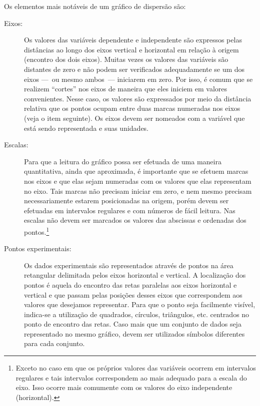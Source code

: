 Os elementos mais notáveis de um gráfico de dispersão são:
\begin{description}
	\item[Eixos:] Os valores das variáveis dependente e independente  são expressos pelas distâncias ao longo dos eixos vertical e horizontal em relação à origem (encontro dos dois eixos). Muitas vezes os valores das variáveis são distantes de zero e não podem ser verificados adequadamente se um dos eixos ---~ou mesmo ambos~--- iniciarem em zero. Por isso, é comum que se realizem ``cortes'' nos eixos de maneira que eles iniciem em valores convenientes. Nesse caso, os valores são expressados por meio da distância relativa que os pontos ocupam entre duas marcas numeradas nos eixos (veja o item seguinte). Os eixos devem ser nomeados com a variável que está sendo representada e suas unidades.
	\item[Escalas:] Para que a leitura do gráfico possa ser efetuada de uma maneira quantitativa, ainda que aproximada, é importante que se efetuem marcas nos eixos e que elas sejam numeradas com os valores que elas representam no eixo. Tais marcas não precisam iniciar em zero, e nem mesmo precisam necessariamente estarem posicionadas na origem, porém devem ser efetuadas em intervalos regulares e com números de fácil leitura. Nas escalas não devem ser marcados os valores das abscissas e ordenadas dos pontos.\footnote{Exceto no caso em que os próprios valores das variáveis ocorrem em intervalos regulares e tais intervalos correspondem ao mais adequado para a escala do eixo. Isso ocorre mais comumente com os valores do eixo independente (horizontal).}
	\item[Pontos experimentais:] Os dados experimentais são representados através de pontos na área retangular delimitada pelos eixos horizontal e vertical. A localização dos pontos é aquela do encontro das retas paralelas aos eixos horizontal e vertical e que passam pelas posições desses eixos que correspondem aos valores que desejamos representar. Para que o ponto seja facilmente visível, indica-se a utilização de quadrados, círculos, triângulos, etc. centrados no ponto de encontro das retas. Caso mais que um conjunto de dados seja representado no mesmo gráfico, devem ser utilizados símbolos diferentes para cada conjunto.
\end{description}

